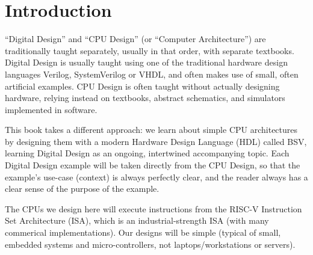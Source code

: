 

\chapter{Introduction}



\setcounter{page}{1}
\renewcommand{\thepage}{\arabic{chapter}-\arabic{page}}

\label{ch_intro}


``Digital Design'' and ``CPU Design'' (or ``Computer Architecture'')
are traditionally taught separately, usually in that order, with
separate textbooks.  Digital Design is usually taught using one of the
traditional hardware design languages Verilog, SystemVerilog or VHDL,
and often makes use of small, often artificial examples.  CPU Design
is often taught without actually designing hardware, relying instead
on textbooks, abstract schematics, and simulators implemented in
software.

This book takes a different approach: we learn about simple CPU
architectures by designing them with a modern Hardware Design Language
(HDL) called BSV, learning Digital Design as an ongoing, intertwined
accompanying topic.  Each Digital Design example will be taken
directly from the CPU Design, so that the example's use-case (context)
is always perfectly clear, and the reader always has a clear sense of
the purpose of the example.

The CPUs we design here will execute instructions from the RISC-V
Instruction Set Architecture (ISA), which is an industrial-strength
ISA (with many commerical implementations).  Our designs will be
simple (typical of small, embedded systems and micro-controllers, not
laptops/workstations or servers).

